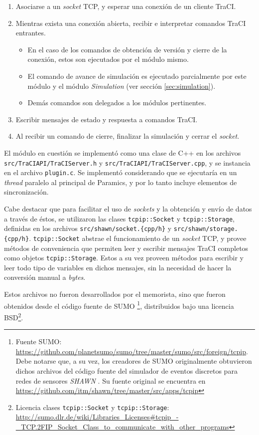 \begin{enumerate}
    \item Asociarse a un \emph{socket} TCP, y esperar una conexión de un cliente TraCI.
    \item Mientras exista una conexión abierta, recibir e interpretar comandos TraCI entrantes.
    \begin{itemize}
        \item En el caso de los comandos de obtención de versión y cierre de la conexión, estos son ejecutados por el módulo mismo.
        \item El comando de avance de simulación es ejecutado parcialmente por este módulo y el módulo \emph{Simulation} (ver sección \ref{sec:simulation}).
        \item Demás comandos son delegados a los módulos pertinentes.
    \end{itemize}
    \item Escribir mensajes de estado y respuesta a comandos TraCI.
    \item Al recibir un comando de cierre, finalizar la simulación y cerrar el \emph{socket}.
\end{enumerate}

El módulo en cuestión se implementó como una clase de C++ en los archivos \texttt{src/TraCIAPI/TraCIServer.h} y \texttt{src/TraCIAPI/TraCIServer.cpp}, y se instancia en el archivo \texttt{plugin.c}. Se implementó considerando que se ejecutaría en un \emph{thread} paralelo al principal de Paramics, y por lo tanto incluye elementos de sincronización.

Cabe destacar que para facilitar el uso de \emph{sockets} y la obtención y envío de datos a través de éstos, se utilizaron las clases \texttt{tcpip::Socket} y \texttt{tcpip::Storage}, definidas en los archivos \texttt{src/shawn/socket.\{cpp/h\}} y \texttt{src/shawn/storage.\{cpp/h\}}. \texttt{tcpip::Socket} abstrae el funcionamiento de un \textit{socket} TCP, y provee métodos de conveniencia que permiten leer y escribir mensajes TraCI completos como objetos \texttt{tcpip::Storage}. Estos a su vez proveen métodos para escribir y leer todo tipo de variables en dichos mensajes, sin la necesidad de hacer la conversión manual a \textit{bytes}.

Estos archivos no fueron desarrollados por el memorista, sino que fueron obtenidos desde el código fuente de SUMO \footnote{Fuente SUMO: \url{https://github.com/planetsumo/sumo/tree/master/sumo/src/foreign/tcpip}. Debe notarse que, a su vez, los creadores de SUMO originalmente obtuvieron dichos archivos del código fuente del simulador de eventos discretos para redes de sensores \emph{SHAWN} \cite{kroller2005shawn}. Su fuente original se encuentra en \url{https://github.com/itm/shawn/tree/master/src/apps/tcpip}}, distribuidos bajo una licencia BSD\footnote{Licencia clases \texttt{tcpip::Socket} y \texttt{tcpip::Storage}: \url{http://sumo.dlr.de/wiki/Libraries_Licenses\#tcpip_-_TCP.2FIP_Socket_Class_to_communicate_with_other_programs}}.

